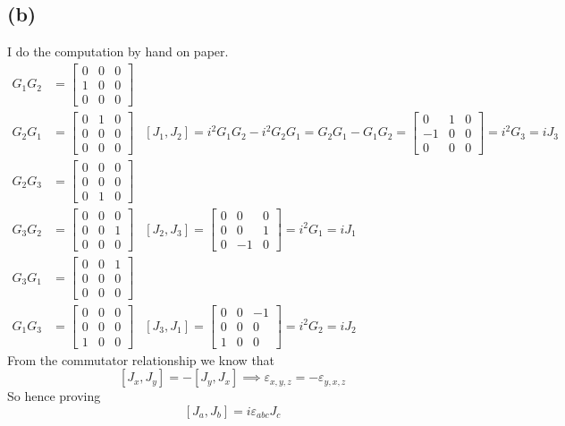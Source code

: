 \documentclass[letterpaper]{article}
\begin{document}
\subsection*{(b)} 
I do the computation by hand on paper. 
\begin{align*}
	G_1 G_2 &=  \begin{bmatrix} 0&0&0\\1&0&0\\0&0&0 \end{bmatrix} \\
	G_2 G_1 &=  \begin{bmatrix} 0&1&0\\0&0&0\\0&0&0 \end{bmatrix}  
		& [J_1, J_2] = i ^2 G_1 G_2 - i^2 G_2 G_1 =  G_2 G_1 - G_1 G_2 = \begin{bmatrix} 0&1&0\\-1&0&0\\0&0&0 \end{bmatrix} = i^2 G_3 = i J_3 \\ 
	G_2 G_3 &=  \begin{bmatrix} 0&0&0\\0&0&0\\0&1&0 \end{bmatrix}   \\ 
	G_3 G_2 &=  \begin{bmatrix} 0&0&0\\0&0&1\\0&0&0 \end{bmatrix}  
		& [J_2, J_3] = \begin{bmatrix} 0&0&0\\0&0&1\\0&-1&0 \end{bmatrix}  = i^2 G_1 = i J_1 \\ 
	G_3 G_1 &=  \begin{bmatrix} 0&0&1\\0&0&0\\0&0&0 \end{bmatrix}  \\
	G_1 G_3 &=  \begin{bmatrix} 0&0&0\\0&0&0\\1&0&0 \end{bmatrix} & [J_3,J_1] = \begin{bmatrix} 0&0&-1\\0&0&0\\1&0&0 \end{bmatrix} = i^2 G_2 = i J_2 
\end{align*}
From the commutator relationship we know that 
\[
	[J_x, J_y] = - [J_y , J_x] \implies \varepsilon_{x,y,z} = - \varepsilon_{y,x,z} 
\]
So hence proving 
\[
	[J_a, J_b ] = i \varepsilon_{abc} J_c
\] 
\end{document}
